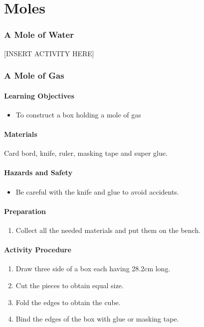 \chapter{Moles}

\subsection{A Mole of Water}

[INSERT ACTIVITY HERE]

\subsection{A Mole of Gas}

\subsubsection*{Learning Objectives}
\begin{itemize}
\item{To construct a box holding a mole of gas}
\end{itemize}

\subsubsection*{Materials}
Card bord, knife, ruler, masking tape and super glue.

\subsubsection*{Hazards and Safety}
\begin{itemize}
\item{Be careful with the knife and glue to avoid accidents.}
\end{itemize}

\subsubsection*{Preparation}
\begin{enumerate}
\item{Collect all the needed materials and put them on the bench.}
\end{enumerate}

\subsubsection*{Activity Procedure}
\begin{enumerate}
\item{Draw three side of a box each having 28.2cm long.}
\item{Cut the pieces to obtain equal size.}
\item{Fold the edges to obtain the cube.}
\item{Bind the edges of the box with glue or masking tape.}
\end{enumerate}

